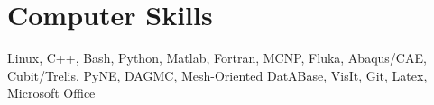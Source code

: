 %
%
\section{Computer Skills}
Linux, C++, Bash, Python, Matlab, Fortran, 
MCNP, Fluka, 
Abaqus/CAE, Cubit/Trelis, 
PyNE, DAGMC, Mesh-Oriented DatABase, 
VisIt, 
Git, Latex, Microsoft Office 
